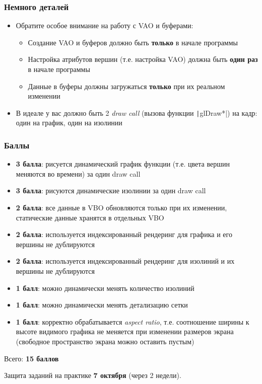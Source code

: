 \documentclass{beamer}
\begin{document}
\begin{frame}[fragile]
\frametitle{Немного деталей}
\begin{itemize}
\item Обратите особое внимание на работу с VAO и буферами:
\begin{itemize}
\item Создание VAO и буферов должно быть \textbf{только} в начале программы
\item Настройка атрибутов вершин (т.е. настройка VAO) должна быть \textbf{один раз} в начале программы
\item Данные в буферы должны загружаться \textbf{только} при их реальном изменении
\end{itemize}
\pause
\item В идеале у вас должно быть 2 \textit{draw call} (вызова функции \texttt|glDraw*|) на кадр: один на график, один на изолинии
\end{itemize}
\end{frame}

\begin{frame}[fragile]
\frametitle{Баллы}
\scriptsize
\begin{itemize}
\item \textbf{3 балла}: рисуется динамический график функции (т.е. цвета вершин меняются во времени) за один draw call
\item \textbf{3 балла}: рисуются динамические изолинии за один draw call
\item \textbf{2 балла}: все данные в VBO обновляются только при их изменении, статические данные хранятся в отдельных VBO
\item \textbf{2 балла}: используется индексированный рендеринг для графика и его вершины не дублируются
\item \textbf{2 балла}: используется индексированный рендеринг для изолиний и их вершины не дублируются
\item \textbf{1 балл}:  можно динамически менять количество изолиний
\item \textbf{1 балл}:  можно динамически менять детализацию сетки
\item \textbf{1 балл}:  корректно обрабатывается \textit{aspect ratio}, т.е. соотношение ширины к высоте видимого графика не меняется при изменении размеров экрана (свободное пространство экрана можно оставить пустым)
\end{itemize}
Всего: \textbf{15 баллов}

Защита заданий на практике \textbf{7 октября} (через 2 недели).
\end{frame}
\end{document}
